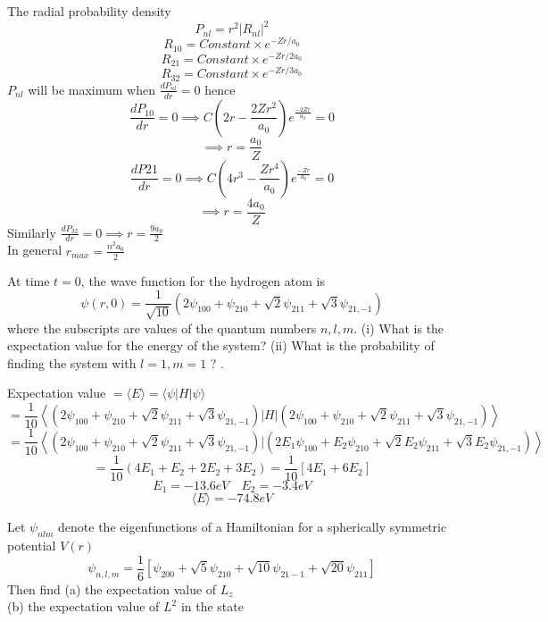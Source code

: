 \begin{enumerate}
\begin{answer}
		The radial probability density \\
		$$P_{nl}=r^2|R_{nl}|^2$$
		$$R_{10}=Constant \times e^{-Zr/a_0}$$
		$$R_{21}=Constant \times e^{-Zr/2a_0}$$
		$$R_{32}=Constant \times e^{-Zr/3a_0}$$
		$P_{nl}$ will be maximum when $\frac{dP_{nl}}{dr}=0$ hence \\
		$$\frac{dP_{10}}{dr}=0 \implies C(2r-\frac{2Zr^2}{a_0})e^{\frac{-2Zr}{a_0}}=0$$
		$$\implies r=\frac{a_0}{Z}$$
		$$\frac{dP{21}}{dr}=0\implies C(4r^3-\frac{Zr^4}{a_0})e^{\frac{-Zr}{a_0}}=0$$
		$$\implies r=\frac{4a_0}{Z}$$
		Similarly $\frac{dP_{32}}{dr}=0\implies r=\frac{9a_0}{2}$\\
		In general $r_{max}=\frac{n^2a_0}{2}$
	\end{answer}
		\begin{minipage}{\textwidth}
		\item 	At time $t=0$, the wave function for the hydrogen atom is
		$$
		\psi(r, 0)=\frac{1}{\sqrt{10}}\left(2 \psi_{100}+\psi_{210}+\sqrt{2} \psi_{211}+\sqrt{3} \psi_{21,-1}\right)
		$$
		where the subscripts are values of the quantum numbers $n, l, m$. (i) What is the expectation value for the energy of the system? (ii) What is the probability of finding the system with $l=1, m=1$ ? .
	\end{minipage}
	\begin{answer}
		Expectation value $=\langle E \rangle =\langle \psi |H|\psi\rangle$\\
		$$=\frac{1}{10}\left\langle \left(2 \psi_{100}+\psi_{210}+\sqrt{2} \psi_{211}+\sqrt{3} \psi_{21,-1}\right)|H|\left(2 \psi_{100}+\psi_{210}+\sqrt{2} \psi_{211}+\sqrt{3} \psi_{21,-1}\right)\right\rangle $$
		$$=\frac{1}{10}\left\langle \left(2 \psi_{100}+\psi_{210}+\sqrt{2} \psi_{211}+\sqrt{3} \psi_{21,-1}\right)|\left(2E_1 \psi_{100}+E_2\psi_{210}+\sqrt{2} E_2\psi_{211}+\sqrt{3}E_2 \psi_{21,-1}\right)\right\rangle $$
		$$=\frac{1}{10}\left( 4E_1+E_2+2E_2+3E_2\right) =\frac{1}{10}\left[ 4E_1+6E_2\right] $$
		$$E_1=-13.6eV \quad E_2=-3.4eV$$
		$$\langle E \rangle=-74.8eV$$
	\end{answer}
	\begin{minipage}{\textwidth}
	\item Let $\psi_{n l m}$ denote the eigenfunctions of a Hamiltonian for a spherically symmetric potential $V(r)$
	$$
	\psi_{n, l, m}=\frac{1}{6}\left[\psi_{200}+\sqrt{5} \psi_{210}+\sqrt{10} \psi_{21-1}+\sqrt{20} \psi_{211}\right]
	$$
	Then find
	(a) the expectation value of $L_{z}$\\
	(b) the expectation value of $L^{2}$ in the state\\

\end{minipage}
\end{enumerate}
